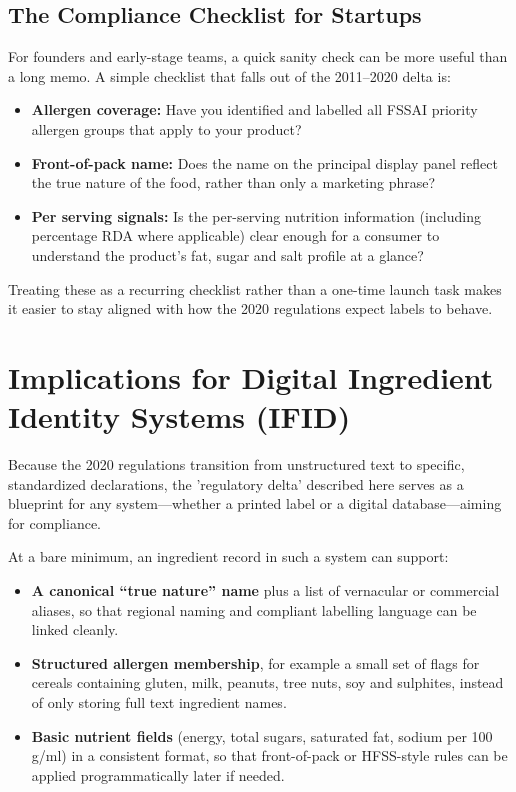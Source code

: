 \documentclass[12pt,a4paper]{article}
\begin{document}
\subsection*{The Compliance Checklist for Startups}

For founders and early-stage teams, a quick sanity check can be more useful than a long memo.
A simple checklist that falls out of the 2011--2020 delta is:

\begin{itemize}
  \item [\phantom{x}] \textbf{Allergen coverage:} Have you identified and labelled all FSSAI priority allergen groups that apply to your product?
  \item [\phantom{x}] \textbf{Front-of-pack name:} Does the name on the principal display panel reflect the true nature of the food, rather than only a marketing phrase?
  \item [\phantom{x}] \textbf{Per serving signals:} Is the per-serving nutrition information (including percentage RDA where applicable) clear enough for a consumer to understand the product’s fat, sugar and salt profile at a glance?
\end{itemize}

Treating these as a recurring checklist rather than a one-time launch task makes it easier to stay aligned with how the 2020 regulations expect labels to behave.

\section{Implications for Digital Ingredient Identity Systems (IFID)}

Because the 2020 regulations transition from unstructured text to specific, standardized declarations, the 'regulatory delta' described here serves as a blueprint for any system—whether a printed label or a digital database—aiming for compliance.

At a bare minimum, an ingredient record in such a system can support:

\begin{itemize}
  \item \textbf{A canonical ``true nature'' name} plus a list of vernacular or commercial aliases, so that regional naming and compliant labelling language can be linked cleanly.
  \item \textbf{Structured allergen membership}, for example a small set of flags for cereals containing gluten, milk, peanuts, tree nuts, soy and sulphites, instead of only storing full text ingredient names.
  \item \textbf{Basic nutrient fields} (energy, total sugars, saturated fat, sodium per 100 g/ml) in a consistent format, so that front-of-pack or HFSS-style rules can be applied programmatically later if needed.
\end{itemize}
\end{document}
